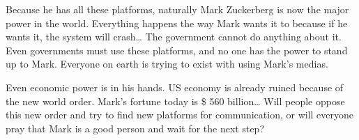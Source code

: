 \documentclass[]{book}
\begin{document}
Because he has all these platforms, naturally Mark Zuckerberg is now the major power in the world. Everything happens the way Mark wants it to because if he wants it, the system will crash\ldots{} The government cannot do anything about it. Even governments must use these platforms, and no one has the power to stand up to Mark. Everyone on earth is trying to exist with using Mark's medias.

Even economic power is in his hands. US economy is already ruined because of the new world order. Mark's fortune today is \$ 560 billion\ldots{} Will people oppose this new order and try to find new platforms for communication, or will everyone pray that Mark is a good person and wait for the next step?


\end{document}
